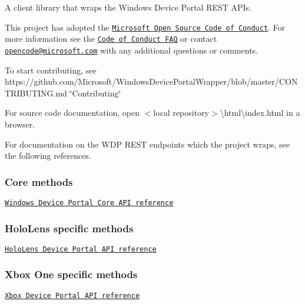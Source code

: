 A client library that wraps the Windows Device Portal R\+E\+ST A\+P\+Is.

This project has adopted the \href{https://opensource.microsoft.com/codeofconduct/}{\tt Microsoft Open Source Code of Conduct}. For more information see the \href{https://opensource.microsoft.com/codeofconduct/faq/}{\tt Code of Conduct F\+AQ} or contact \href{mailto:opencode@microsoft.com}{\tt opencode@microsoft.\+com} with any additional questions or comments. 

 



To start contributing, see https\+://github.com/\+Microsoft/\+Windows\+Device\+Portal\+Wrapper/blob/master/\+C\+O\+N\+T\+R\+I\+B\+U\+T\+I\+N\+G.\+md \char`\"{}\+Contributing\char`\"{} 

 



For source code documentation, open $<$local repository$>$\textbackslash{}html\textbackslash{}index.\+html in a browser. 

 



For documentation on the W\+DP R\+E\+ST endpoints which the project wraps, see the following references.

\subsubsection*{Core methods}

\href{https://msdn.microsoft.com/en-us/windows/uwp/debug-test-perf/device-portal-api-core}{\tt Windows Device Portal Core A\+PI reference} 



\subsubsection*{Holo\+Lens specific methods}

\href{https://developer.microsoft.com/en-us/windows/holographic/device_portal_api_reference}{\tt Holo\+Lens Device Portal A\+PI reference} 



\subsubsection*{Xbox One specific methods}

\href{https://msdn.microsoft.com/en-us/windows/uwp/xbox-apps/reference}{\tt Xbox Device Portal A\+PI reference} 

 